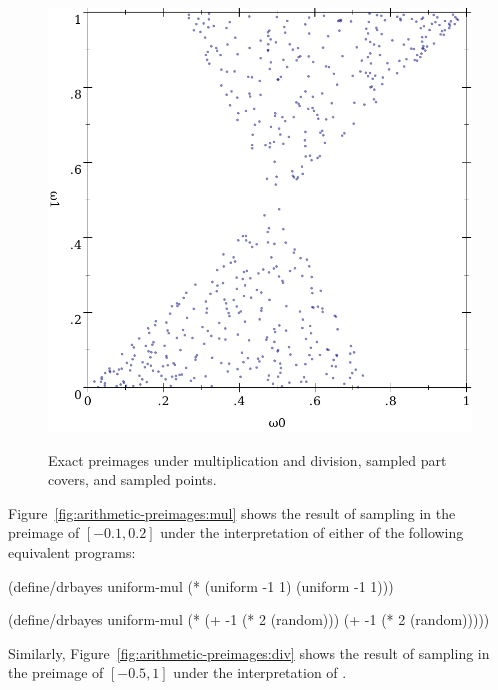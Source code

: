 \begin{figure}[tb!]
{\includegraphics[width=\subfigurewidth]{results/div-preimage-points}%
}
\caption[Sampling from preimages under multiplication and division]{Exact preimages under multiplication and division, sampled part covers, and sampled points.}%
\label{fig:arithmetic-preimages}
\end{figure}

Figure~\ref{fig:arithmetic-preimages:mul} shows the result of sampling in the preimage of $[-0.1,0.2]$ under the interpretation of either of the following equivalent programs:
\begin{center}\singlespacing
\begin{minipage}{2.2in}
\begin{schemedisplay}
(define/drbayes uniform-mul
  (* (uniform -1 1)
     (uniform -1 1)))
\end{schemedisplay}
\end{minipage}
\hspace{0.5in}
\begin{minipage}{2.3in}
\begin{schemedisplay}
(define/drbayes uniform-mul
  (* (+ -1 (* 2 (random)))
     (+ -1 (* 2 (random)))))
\end{schemedisplay}
\end{minipage}
\vspace{\baselineskip}
\end{center}
Similarly, Figure~\ref{fig:arithmetic-preimages:div} shows the result of sampling in the preimage of $[-0.5,1]$ under the interpretation of .


